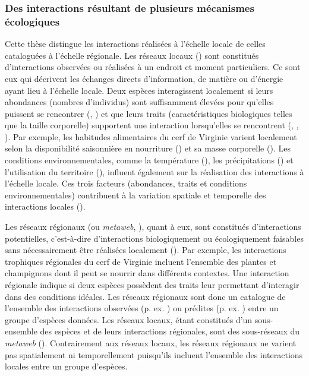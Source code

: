 \subsubsection{Des interactions résultant de plusieurs mécanismes écologiques} 

Cette thèse distingue les interactions réalisées à l'échelle locale de celles
cataloguées à l'échelle régionale. Les réseaux locaux
(\cite{Poisot2012Dissimilarity}) sont constitués d'interactions observées ou
réalisées à un endroit et moment particuliers. Ce sont eux qui décrivent les
échanges directs d'information, de matière ou d'énergie ayant lieu à l'échelle
locale. Deux espèces interagissent localement si leurs abondances (nombres
d'individus) sont suffisamment élevées pour qu'elles puissent se rencontrer
(\cite{Canard2012Emergence}, \cite{Canard2014Empirical}) et que leurs traits
(caractéristiques biologiques telles que la taille corporelle) supportent une
interaction lorsqu'elles se rencontrent (\cite{Bolnick2011Why},
\cite{Gravel2013Inferring}, \cite{Stouffer2011Role}). Par exemple, les habitudes
alimentaires du cerf de Virginie varient localement selon la disponibilité
saisonnière en nourriture (\cite{Short1975Nutrition}) et sa masse corporelle
(\cite{Luna2013Influence}). Les conditions environnementales, comme la
température (\cite{Angilletta2004Temperature}), les précipitations
(\cite{Woodward2012Climate}) et l'utilisation du territoire
(\cite{Tylianakis2007Habitat}), influent également sur la réalisation des
interactions à l'échelle locale. Ces trois facteurs (abondances, traits et
conditions environnementales) contribuent à la variation spatiale et temporelle
des interactions locales (\cite{Poisot2015Species}). 

Les réseaux régionaux (ou \textit{metaweb}, \cite{Pascual2006Ecological}), quant
à eux, sont constitués d'interactions potentielles, c'est-à-dire d'interactions
biologiquement ou écologiquement faisables sans nécessairement être réalisées
localement (\cite{Tylianakis2017Ecological}). Par exemple, les interactions
trophiques régionales du cerf de Virginie incluent l'ensemble des plantes et
champignons dont il peut se nourrir dans différents contextes. Une interaction
régionale indique si deux espèces possèdent des traits leur permettant
d'interagir dans des conditions idéales. Les réseaux régionaux sont donc un
catalogue de l'ensemble des interactions observées (p. ex.
\cite{Maiorano2020Tetraeu}) ou prédites (p. ex. \cite{Strydom2022Food}) entre un
groupe d'espèces données. Les réseaux locaux, étant constitués d'un
sous-ensemble des espèces et de leurs interactions régionales, sont des
sous-réseaux du \textit{metaweb} (\cite{Saravia2022Ecological}). Contrairement
aux réseaux locaux, les réseaux régionaux ne varient pas spatialement ni
temporellement puisqu'ils incluent l'ensemble des interactions locales entre un
groupe d'espèces. 

